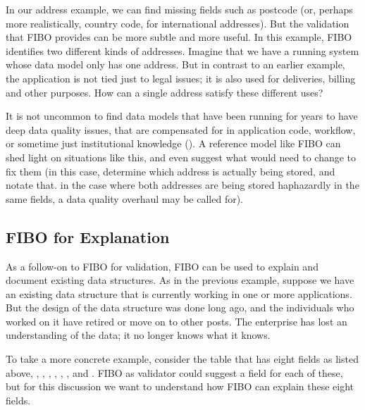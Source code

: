 In our address example, we can find missing fields such as postcode (or, perhaps more realistically, country code, for international addresses).  But the validation that FIBO provides can be more subtle and more useful.  In this example, FIBO identifies two different kinds of addresses.  Imagine that we have a running system whose data model only has one address.  But in contrast to an earlier example, the application is not tied just to legal issues; it is also used for deliveries, billing and other purposes.  How can a single address satisfy these different uses? 

It is not uncommon to find data models that have been running  for years to have deep data quality issues, that are compensated for in application code, workflow, or sometime just institutional knowledge ().  A reference model like FIBO can shed light on situations like this, and even suggest what would need to change to fix them (in this case, determine which address is actually being stored, and notate that.  in the case where both addresses are being stored haphazardly in the same fields, a data quality overhaul may be called for). 

\subsection{FIBO for Explanation}

As a follow-on to FIBO for validation, FIBO can be used to explain and document existing data structures.  As in the previous example, suppose we have an existing data structure that is currently working in one or more applications.  But the design of the data structure was done long ago, and the individuals who worked on it have retired or move on to other posts.  The enterprise has lost an understanding of the data; it no longer knows what it knows. 

To take a more concrete example, consider the table that has eight fields as listed above, , , , , , ,  and .  FIBO as validator could suggest a  field for each of these, but for this discussion we want to understand how FIBO can explain these eight fields.  


